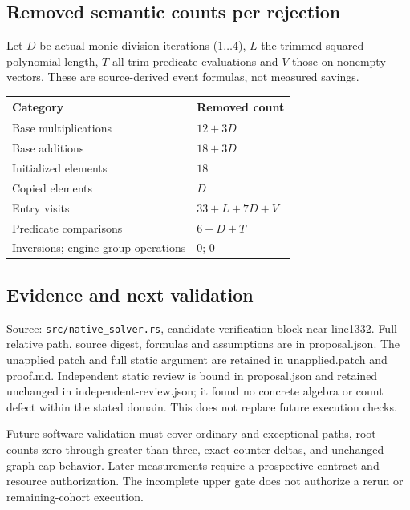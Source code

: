 \documentclass[11pt]{article}
\begin{document}
\subsection*{Removed semantic counts per rejection}
Let $D$ be actual monic division iterations ($1\ldots4$), $L$ the trimmed squared-polynomial length, $T$ all trim predicate evaluations and $V$ those on nonempty vectors. These are source-derived event formulas, not measured savings.
\begin{center}\begin{tabular}{ll}\toprule
Category&Removed count\\\midrule
Base multiplications&$12+3D$\\
Base additions&$18+3D$\\
Initialized elements&$18$\\
Copied elements&$D$\\
Entry visits&$33+L+7D+V$\\
Predicate comparisons&$6+D+T$\\
Inversions; engine group operations&$0$; $0$\\\bottomrule
\end{tabular}\end{center}
\subsection*{Evidence and next validation}
Source: \texttt{src/native\_solver.rs}, candidate-verification block near line1332. Full relative path, source digest, formulas and assumptions are in proposal.json. The unapplied patch and full static argument are retained in unapplied.patch and proof.md. Independent static review is bound in proposal.json and retained unchanged in independent-review.json; it found no concrete algebra or count defect within the stated domain. This does not replace future execution checks.\par
Future software validation must cover ordinary and exceptional paths, root counts zero through greater than three, exact counter deltas, and unchanged graph cap behavior. Later measurements require a prospective contract and resource authorization. The incomplete upper gate does not authorize a rerun or remaining-cohort execution.
\end{document}
